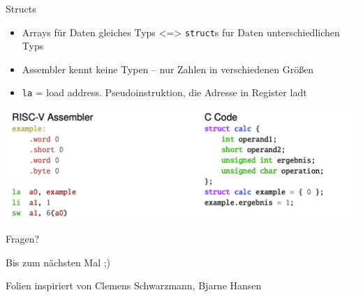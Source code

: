\documentclass[
  german,            %
  aspectratio=169,    %
]{tumbeamer}
\begin{document}
\begin{frame}[c]{Structs}{}
  \begin{itemize}
    \item Arrays für Daten gleiches Typs <=> \texttt{struct}s fur Daten unterschiedlichen Typs 
    \item Assembler kennt keine Typen -- nur Zahlen in verschiedenen Größen
    \item \texttt{la} = load address. Pseudoinstruktion, die Adresse in Register ladt
  \end{itemize}
  \vspace{0.4cm}
  \includegraphics[width=\linewidth]{strutcs_comparison.png}
\end{frame} 



\begin{frame}[c]{}{}
  \begin{center}
    \LARGE Fragen?
  \end{center}
  \vspace{0.5cm}
  \begin{center}
    \LARGE Bis zum nächsten Mal ;) \\
  \end{center}
  \vspace{1.0cm}
  \begin{center}
    \small Folien inspiriert von Clemens Schwarzmann, Bjarne Hansen
  \end{center}
\end{frame}
\end{document}
